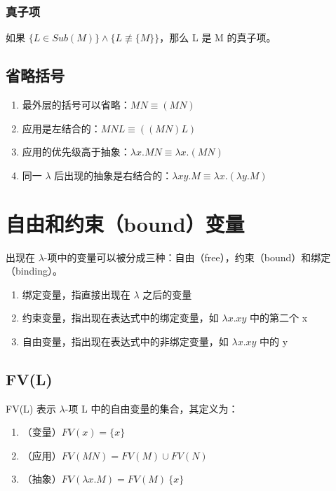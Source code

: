 \documentclass[UTF8]{article}
\begin{document}
\subsubsection{真子项}

	如果 $\{L \in Sub(M)\} \land \{L \not \equiv\{M\}\}$，那么 L 是 M 的真子项。
	
\subsection{省略括号}

	\begin{enumerate}
		\item 最外层的括号可以省略：$MN \equiv (MN)$
		\item 应用是左结合的：$MNL \equiv ((MN)L)$
		\item 应用的优先级高于抽象：$\lambda x.MN \equiv \lambda x.(MN)$
		\item 同一 $\lambda$ 后出现的抽象是右结合的：$\lambda xy.M \equiv \lambda x. (\lambda y. M)$
	\end{enumerate}

\section{自由和约束（bound）变量}

	出现在 $\lambda$-项中的变量可以被分成三种：自由（free），约束（bound）和绑定（binding）。
	
	\begin{enumerate}
		\item 绑定变量，指直接出现在 $\lambda$ 之后的变量
		\item 约束变量，指出现在表达式中的绑定变量，如 $\lambda x. xy$ 中的第二个 x
		\item 自由变量，指出现在表达式中的非绑定变量，如 $\lambda x. xy$ 中的 y
	\end{enumerate}
	
\subsection{FV(L)}

	FV(L) 表示 $\lambda$-项 L 中的自由变量的集合，其定义为：
	\begin{enumerate}
		\item （变量）$FV(x) = \{x\}$
		\item （应用）$FV(MN) = FV(M) \cup FV(N)$
		\item （抽象）$FV(\lambda x. M) = FV(M) \ \{x\}$
	\end{enumerate}
\end{document}
